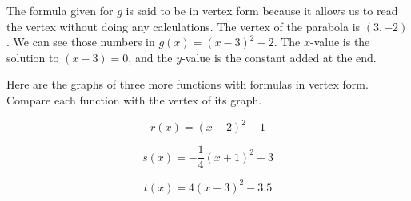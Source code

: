 \documentclass{ximera}
\begin{document}
    The formula given for $g$ is said to be in vertex form
    because it allows us to read the vertex without doing any calculations.
    The vertex of the parabola is $(3,-2)$.
    We can see those numbers in $g(x)=(x-3)^2-2$.
    The $x$-value is the solution to $(x-3)=0$,
    and the $y$-value is the constant
    added at the end.



      
\begin{example}
      Here are the graphs of three more functions with formulas in vertex form.
      Compare each function with the vertex of its graph.

   
       

           \begin{image}
\end{image}
$$
r(x)=(x-2)^2+1
$$
           \begin{image}
\end{image}
$$
s(x)=-\frac{1}{4}(x+1)^2+3
$$      
\begin{image}
\end{image}
$$
t(x)=4(x+3)^2-3.5
$$
\end{example}
\end{document}
